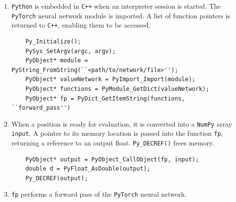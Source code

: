 \documentclass[12pt,a4paper]{book}
\begin{document}
\begin{center}
\begin{msc}{}
  \setlength{\instdist}{10cm}
  
  \nextlevel[2]
  
  \nextlevel[3]
  
  \nextlevel[3]
  

  \nextlevel[2]
  
  \nextlevel
  
  \nextlevel[3]
  
\end{msc}
\end{center}

\begin{enumerate}
\item \texttt{Python} is embedded in \texttt{C++} when an interpreter session is started. The \texttt{PyTorch} neural network module is imported. A list of function pointers is returned to \texttt{C++}, enabling them to be accessed.
  \begin{verbatim}
    Py_Initialize();
    PySys_SetArgv(argc, argv);
    PyObject* module = PyString_FromString(``<path/to/network/file>'');
    PyObject* valueNetwork = PyImport_Import(module);
    PyObject* functions = PyModule_GetDict(valueNetwork);
    PyObject* fp = PyDict_GetItemString(functions, ``forward_pass'')
  \end{verbatim}

\item When a position is ready for evaluation, it is converted into a \texttt{NumPy} array \texttt{input}. A pointer to its memory location is passed into the function \texttt{fp}, returning a reference to an output float. \texttt{Py\_DECREF()} frees memory.
  \begin{verbatim}
    PyObject* output = PyObject_CallObject(fp, input);
    double d = PyFloat_AsDouble(output);
    Py_DECREF(output);
  \end{verbatim}
  
\item \texttt{fp} performs a forward pass of the \texttt{PyTorch} neural network.
  
\end{enumerate}
\end{document}
